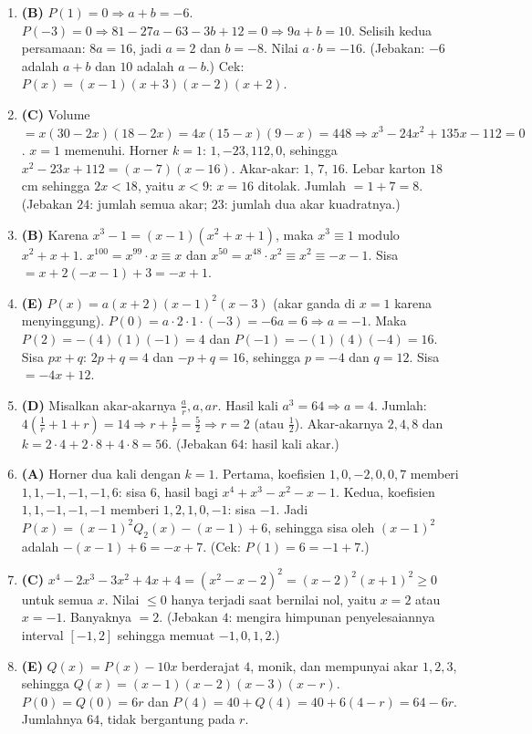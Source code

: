 \documentclass[a4paper,11pt]{article}
\newcounter{no}
\begin{document}
\begin{enumerate}[leftmargin=2em,itemsep=2pt,topsep=2pt]
\item[\textbf{9.}] \textbf{(B)} $P(1)=0\Rightarrow a+b=-6$. $P(-3)=0\Rightarrow81-27a-63-3b+12=0\Rightarrow9a+b=10$. Selisih kedua persamaan: $8a=16$, jadi $a=2$ dan $b=-8$. Nilai $a\cdot b=-16$. (Jebakan: $-6$ adalah $a+b$ dan $10$ adalah $a-b$.) Cek: $P(x)=(x-1)(x+3)(x-2)(x+2)$.
\item[\textbf{10.}] \textbf{(C)} Volume $=x(30-2x)(18-2x)=4x(15-x)(9-x)=448\Rightarrow x^3-24x^2+135x-112=0$. $x=1$ memenuhi. Horner $k=1$: $1,-23,112,0$, sehingga $x^2-23x+112=(x-7)(x-16)$. Akar-akar: $1$, $7$, $16$. Lebar karton $18$ cm sehingga $2x<18$, yaitu $x<9$: $x=16$ ditolak. Jumlah $=1+7=8$. (Jebakan $24$: jumlah semua akar; $23$: jumlah dua akar kuadratnya.)
\item[\textbf{11.}] \textbf{(B)} Karena $x^3-1=(x-1)(x^2+x+1)$, maka $x^3\equiv1$ modulo $x^2+x+1$. $x^{100}=x^{99}\cdot x\equiv x$ dan $x^{50}=x^{48}\cdot x^2\equiv x^2\equiv-x-1$. Sisa $=x+2(-x-1)+3=-x+1$.
\item[\textbf{12.}] \textbf{(E)} $P(x)=a(x+2)(x-1)^2(x-3)$ (akar ganda di $x=1$ karena menyinggung). $P(0)=a\cdot2\cdot1\cdot(-3)=-6a=6\Rightarrow a=-1$. Maka $P(2)=-(4)(1)(-1)=4$ dan $P(-1)=-(1)(4)(-4)=16$. Sisa $px+q$: $2p+q=4$ dan $-p+q=16$, sehingga $p=-4$ dan $q=12$. Sisa $=-4x+12$.
\item[\textbf{13.}] \textbf{(D)} Misalkan akar-akarnya $\frac ar,a,ar$. Hasil kali $a^3=64\Rightarrow a=4$. Jumlah: $4\left(\frac1r+1+r\right)=14\Rightarrow r+\frac1r=\frac52\Rightarrow r=2$ (atau $\frac12$). Akar-akarnya $2,4,8$ dan $k=2\cdot4+2\cdot8+4\cdot8=56$. (Jebakan $64$: hasil kali akar.)
\item[\textbf{14.}] \textbf{(A)} Horner dua kali dengan $k=1$. Pertama, koefisien $1,0,-2,0,0,7$ memberi $1,1,-1,-1,-1,6$: sisa $6$, hasil bagi $x^4+x^3-x^2-x-1$. Kedua, koefisien $1,1,-1,-1,-1$ memberi $1,2,1,0,-1$: sisa $-1$. Jadi $P(x)=(x-1)^2Q_2(x)-(x-1)+6$, sehingga sisa oleh $(x-1)^2$ adalah $-(x-1)+6=-x+7$. (Cek: $P(1)=6=-1+7$.)
\item[\textbf{15.}] \textbf{(C)} $x^4-2x^3-3x^2+4x+4=(x^2-x-2)^2=(x-2)^2(x+1)^2\ge0$ untuk semua $x$. Nilai $\le0$ hanya terjadi saat bernilai nol, yaitu $x=2$ atau $x=-1$. Banyaknya $=2$. (Jebakan $4$: mengira himpunan penyelesaiannya interval $[-1,2]$ sehingga memuat $-1,0,1,2$.)
\item[\textbf{16.}] \textbf{(E)} $Q(x)=P(x)-10x$ berderajat $4$, monik, dan mempunyai akar $1,2,3$, sehingga $Q(x)=(x-1)(x-2)(x-3)(x-r)$. $P(0)=Q(0)=6r$ dan $P(4)=40+Q(4)=40+6(4-r)=64-6r$. Jumlahnya $64$, tidak bergantung pada $r$.

\end{enumerate}
\end{document}
